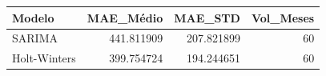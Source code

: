 \begin{tabular}{lrrr}
\toprule
Modelo & MAE\_Médio & MAE\_STD & Vol\_Meses \\
\midrule
SARIMA & 441.811909 & 207.821899 & 60 \\
Holt-Winters & 399.754724 & 194.244651 & 60 \\
\bottomrule
\end{tabular}
